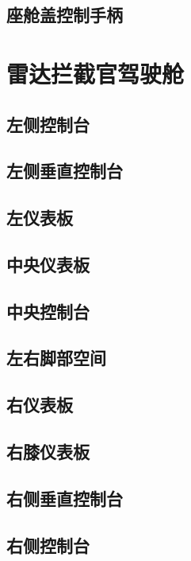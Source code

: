 \subsection{座舱盖控制手柄}

\section{雷达拦截官驾驶舱}

\subsection{左侧控制台}

\subsection{左侧垂直控制台}

\subsection{左仪表板}

\subsection{中央仪表板}

\subsection{中央控制台}


\subsection{左右脚部空间}

\subsection{右仪表板}

\subsection{右膝仪表板}

\subsection{右侧垂直控制台}

\subsection{右侧控制台}

